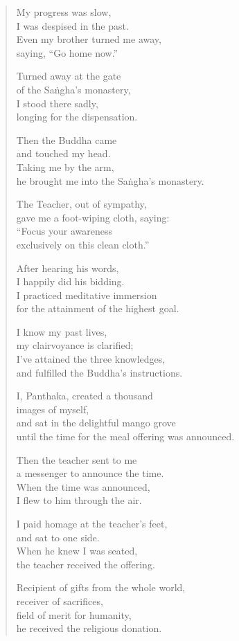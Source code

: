\documentclass[12pt,openany]{book}%
\begin{document}
\begin{verse}%
My progress was slow, \\
I was despised in the past. \\
Even my brother turned me away, \\
saying, “Go home now.” 

Turned away at the gate \\
of the \textsanskrit{Saṅgha}’s monastery, \\
I stood there sadly, \\
longing for the dispensation. 

Then the Buddha came \\
and touched my head. \\
Taking me by the arm, \\
he brought me into the \textsanskrit{Saṅgha}’s monastery. 

The Teacher, out of sympathy, \\
gave me a foot-wiping cloth, saying: \\
“Focus your awareness \\
exclusively on this clean cloth.” 

After hearing his words, \\
I happily did his bidding. \\
I practiced meditative immersion \\
for the attainment of the highest goal. 

I know my past lives, \\
my clairvoyance is clarified; \\
I’ve attained the three knowledges, \\
and fulfilled the Buddha’s instructions. 

I, Panthaka, created a thousand \\
images of myself, \\
and sat in the delightful mango grove \\
until the time for the meal offering was announced. 

Then the teacher sent to me \\
a messenger to announce the time. \\
When the time was announced, \\
I flew to him through the air. 

I paid homage at the teacher’s feet, \\
and sat to one side. \\
When he knew I was seated, \\
the teacher received the offering. 

Recipient of gifts from the whole world, \\
receiver of sacrifices, \\
field of merit for humanity, \\
he received the religious donation. 

%
\end{verse}
\end{document}
